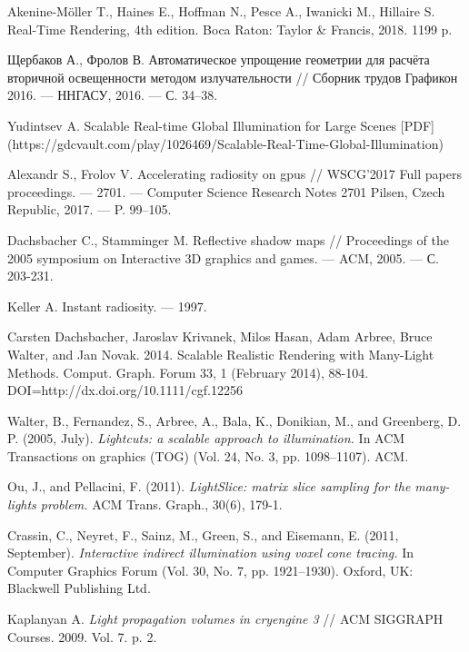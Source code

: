 \documentclass[oneside,final,12pt, a4paper]{extreport}
\begin{document}
\begin{thebibliography}{00}

 Akenine-Möller T., Haines E., Hoffman N., Pesce A., Iwanicki M., Hillaire S. Real-Time Rendering, 4th edition. Boca Raton: Taylor \& Francis, 2018. 1199 p.

 Щербаков А., Фролов В. Автоматическое упрощение геометрии для расчёта вторичной освещенности методом излучательности // Сборник трудов Графикон 2016. — ННГАСУ, 2016. — С. 34–38.

 Yudintsev A. Scalable Real-time Global Illumination for Large Scenes [PDF] (https://gdcvault.com/play/1026469/Scalable-Real-Time-Global-Illumination)

 Alexandr S., Frolov V. Accelerating radiosity on gpus // WSCG'2017 Full papers proceedings. — 2701. — Computer Science Research Notes 2701 Pilsen, Czech Republic, 2017. — P. 99–105.

 Dachsbacher C., Stamminger M. Reflective shadow maps // Proceedings of the 2005 symposium on Interactive 3D graphics and games. --- ACM, 2005. --- С. 203-231.

 Keller A. Instant radiosity. --- 1997.

 Carsten Dachsbacher, Jaroslav Krivanek, Milos Hasan, Adam Arbree, Bruce Walter, and Jan Novak. 2014. Scalable Realistic Rendering with Many-Light Methods. Comput. Graph. Forum 33, 1 (February 2014), 88-104. DOI=http://dx.doi.org/10.1111/cgf.12256

 Walter, B., Fernandez, S., Arbree, A., Bala, K., Donikian, M., and Greenberg, D. P. (2005, July). {\em Lightcuts: a scalable approach to illumination.} In ACM Transactions on graphics (TOG) (Vol. 24, No. 3, pp. 1098--1107). ACM.

 Ou, J., and Pellacini, F. (2011). {\em LightSlice: matrix slice sampling for the many-lights problem.} ACM Trans. Graph., 30(6), 179-1.

 Crassin, C., Neyret, F., Sainz, M., Green, S., and Eisemann, E. (2011, September). {\em Interactive indirect illumination using voxel cone tracing.} In Computer Graphics Forum (Vol. 30, No. 7, pp. 1921--1930). Oxford, UK: Blackwell Publishing Ltd.

 Kaplanyan A. {\em Light propagation volumes in cryengine 3} // ACM SIGGRAPH Courses. 2009. Vol. 7. p. 2.


\end{thebibliography}
\end{document}
